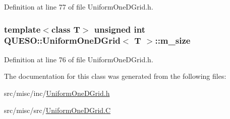 Definition at line 77 of file Uniform\-One\-D\-Grid.\-h.

\hypertarget{class_q_u_e_s_o_1_1_uniform_one_d_grid_a4d76f44ccd66199aa55fa75aed57ffaa}{
\subsubsection[{m\-\_\-size}]{\setlength{\rightskip}{0pt plus 5cm}template$<$class T$>$ unsigned int {\bf Q\-U\-E\-S\-O\-::\-Uniform\-One\-D\-Grid}$<$ T $>$\-::m\-\_\-size\hspace{0.3cm}{\ttfamily [protected]}}}\label{class_q_u_e_s_o_1_1_uniform_one_d_grid_a4d76f44ccd66199aa55fa75aed57ffaa}


Definition at line 76 of file Uniform\-One\-D\-Grid.\-h.



The documentation for this class was generated from the following files\-:\begin{DoxyCompactItemize}
\item 
src/misc/inc/\hyperlink{_uniform_one_d_grid_8h}{Uniform\-One\-D\-Grid.\-h}\item 
src/misc/src/\hyperlink{_uniform_one_d_grid_8_c}{Uniform\-One\-D\-Grid.\-C}\end{DoxyCompactItemize}
